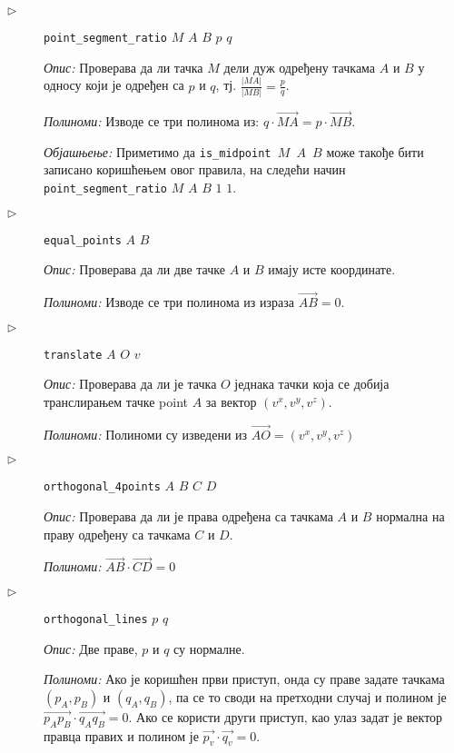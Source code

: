 \begin{description}
\item[$\triangleright$] {\tt point\_segment\_ratio} $M$ $A$ $B$ $p$ $q$

{\em Опис:} Проверава да ли тачка $M$ дели дуж одређену тачкама $A$ и
$B$ у односу који је одређен са $p$ и $q$, тј. $\frac{|MA|}{|MB|} =
\frac{p}{q}$.

{\em Полиноми:} Изводе се три полинома из:
$q\cdot \overrightarrow{MA} = p\cdot \overrightarrow{MB}$.

{\em Објашњење:} Приметимо да {\tt is\_midpoint $M$ $A$ $B$} може
такође бити записано коришћењем овог правила, на следећи начин {\tt
  point\_segment\_ratio} $M$ $A$ $B$ $1$ $1$.


\item[$\triangleright$] {\tt equal\_points} $A$ $B$

{\em Опис:} Проверава да ли две тачке $A$ и $B$ имају исте координате.

{\em Полиноми:} Изводе се три полинома из израза $\overrightarrow{AB}
= 0$.


\item[$\triangleright$] {\tt translate} $A$ $O$ $v$

  {\em Опис:} Проверава да ли је тачка $O$ једнака тачки која се
  добија транслирањем тачке point $A$ за вектор $(v^x, v^y, v^z)$.

  {\em Полиноми:} Полиноми су изведени из $\overrightarrow{AO} = (v^x,
  v^y, v^z)$


\item[$\triangleright$] {\tt orthogonal\_4points} $A$ $B$ $C$ $D$

{\em Опис:} Проверава да ли је права одређена са тачкама $A$ и $B$
нормална на праву одређену са тачкама $C$ и $D$.

{\em Полиноми:} $\overrightarrow{AB} \cdot \overrightarrow{CD} = 0$


\item[$\triangleright$] {\tt orthogonal\_lines} $p$ $q$

{\em Опис:} Две праве, $p$ и $q$ су нормалне.

{\em Полиноми:} Ако је коришћен први приступ, онда су праве задате
тачкама $(p_A, p_B)$ и $(q_A, q_B)$, па се то своди на претходни
случај и полином је $\overrightarrow{p_Ap_B} \cdot
\overrightarrow{q_Aq_B} = 0$. Ако се користи други приступ, као улаз
задат је вектор правца правих и полином је $\overrightarrow{p_v} \cdot
\overrightarrow{q_v} = 0.$


\end{description}
